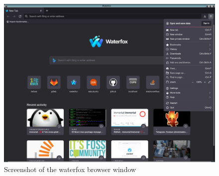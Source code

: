 %

\begin{figure}[!h]
  \centering
   \includegraphics[width=1.1\textwidth]{waterfox.png}
  \caption{Screenshot of the waterfox browser window}
  \label{fig:waterfox}
\end{figure}

%

